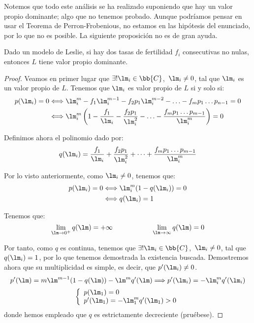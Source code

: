 Notemos que todo este análisis se ha realizado suponiendo que hay un valor propio dominante; algo que no tenemos probado. Aunque podríamos pensar en usar el Teorema de Perron-Frobenious, no estamos en las hipótesis del enunciado, por lo que no es posible. La siguiente proposición no es de gran ayuda.
\begin{prop}
    Dado un modelo de Leslie,
    si hay dos tasas de fertilidad $f_i$ consecutivas no nulas, entonces $L$ tiene valor propio dominante.
    \begin{proof}
    Veamos en primer lugar que $\exists !\lm_i\in \bb{C}$,~$\lm_i\neq 0$, tal que $\lm_i$ es un valor propio de $L$. Tenemos que $\lm_i$ es valor propio de $L$ si y solo si:
    \begin{align*}
        p(\lm_i) = 0 &\Longleftrightarrow \lm_i^m - f_1 \lm_i^{m-1} - f_2p_1\lm_i^{m-2} - \ldots - f_m p_1 \ldots p_{n-1} = 0 \\
        &\Longleftrightarrow \lm_i^m \left(1 - \dfrac{f_1}{\lm_i} - \dfrac{f_2p_1}{\lm_i^2} - \ldots - \dfrac{f_mp_1\ldots p_{m-1}}{\lm_i^m}\right) = 0
    \end{align*}
    
    Definimos ahora el polinomio dado por:
    \begin{equation*}
        q(\lm_i) = \dfrac{f_1}{\lm_i} + \dfrac{f_2p_1}{\lm_i^2} + \cdots + \dfrac{f_mp_1\ldots p_{m-1}}{\lm_i^m}
    \end{equation*}

    Por lo visto anteriormente, como $\lm_i\neq 0$, tenemos que:
    \begin{align*}
        p(\lm_i) = 0 &\Longleftrightarrow  \lm_i^m (1-q(\lm_i)) = 0 \\
        &\Longleftrightarrow q(\lm_i) = 1
    \end{align*}

    Tenemos que:
    \begin{equation*}
        \lim_{\lm\to 0^+}q(\lm) = +\infty
        \hspace{2cm}
        \lim_{\lm\to \infty}q(\lm) = 0
    \end{equation*}

    Por tanto, como $q$ es continua, tenemos que $\exists !\lm_i\in \bb{C}$,~$\lm_i\neq 0$, tal que $q(\lm_i)=1$, por lo que tenemos demostrada la existencia buscada. Demostremos ahora que su multiplicidad es simple, es decir, que $p'(\lm_i)\neq 0$.
    \begin{equation*}
        p'(\lm) = m\lm^{m-1} (1-q(\lm)) - \lm^m q'(\lm)
        \Longrightarrow p'(\lm_i) = -\lm^m_i q'(\lm_i)
    \end{equation*}
    \begin{equation*}
        \left\{ \begin{array}{l}
            p(\lm_1) = 0 \\
            p'(\lm_1) = -\lm^m_1 q'(\lm_1) >0
        \end{array}\right.
    \end{equation*}
    donde hemos empleado que $q$ es estrictamente decreciente (pruébese).



\end{proof}
\end{prop}
